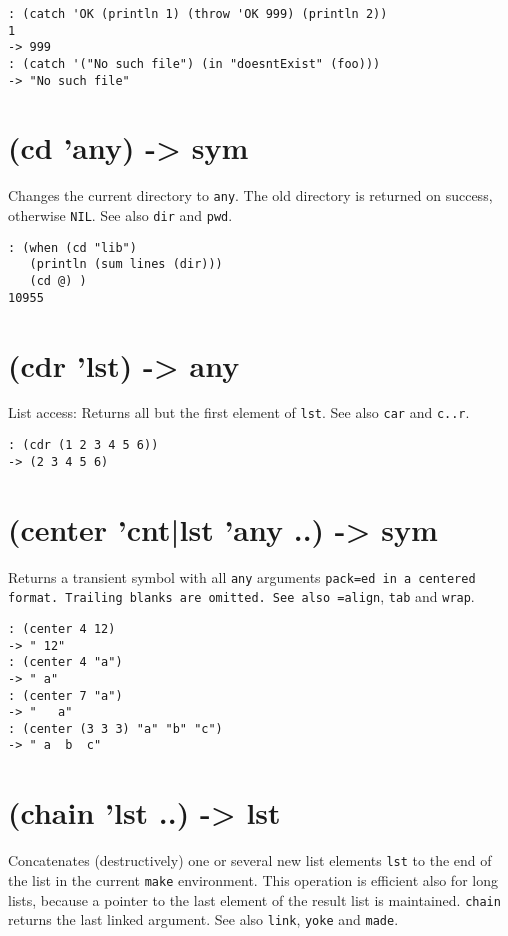 {\begin{verbatim}
: (catch 'OK (println 1) (throw 'OK 999) (println 2))
1
-> 999
: (catch '("No such file") (in "doesntExist" (foo)))
-> "No such file"
\end{verbatim}

 
\section{(cd 'any) -> sym}
\label{sec-8-1-3-10}


Changes the current directory to \texttt{any}. The old directory is returned on
success, otherwise \texttt{NIL}. See also \texttt{dir} and \texttt{pwd}.


\begin{verbatim}
: (when (cd "lib")
   (println (sum lines (dir)))
   (cd @) )
10955
\end{verbatim}

 
\section{(cdr 'lst) -> any}
\label{sec-8-1-3-11}


List access: Returns all but the first element of \texttt{lst}. See also \texttt{car}
and \texttt{c..r}.


\begin{verbatim}
: (cdr (1 2 3 4 5 6))
-> (2 3 4 5 6)
\end{verbatim}

 
\section{(center 'cnt|lst 'any ..) -> sym}
\label{sec-8-1-3-12}


Returns a transient symbol with all \texttt{any} arguments \texttt{pack=ed in a centered format. Trailing blanks are omitted. See also =align}, \texttt{tab}
and \texttt{wrap}.


\begin{verbatim}
: (center 4 12)
-> " 12"
: (center 4 "a")
-> " a"
: (center 7 "a")
-> "   a"
: (center (3 3 3) "a" "b" "c")
-> " a  b  c"
\end{verbatim}

 
\section{(chain 'lst ..) -> lst}
\label{sec-8-1-3-13}


Concatenates (destructively) one or several new list elements \texttt{lst} to
the end of the list in the current \texttt{make} environment. This operation is
efficient also for long lists, because a pointer to the last element of
the result list is maintained. \texttt{chain} returns the last linked argument.
See also \texttt{link}, \texttt{yoke} and \texttt{made}.


}

